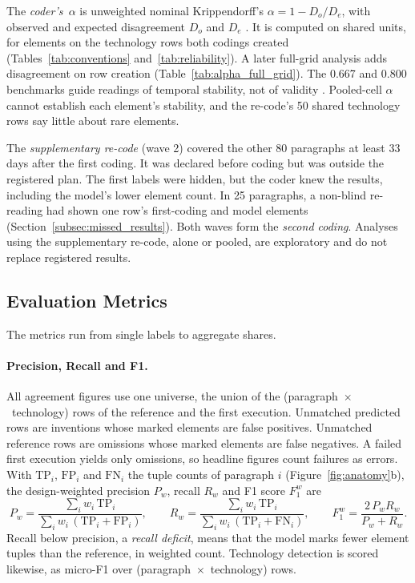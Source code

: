 The \emph{coder's~$\alpha$} is unweighted nominal Krippendorff's $\alpha = 1 - D_o/D_e$, with observed and expected disagreement $D_o$ and $D_e$ \parencite[pp.~1, 3]{krippendorff2011computing}. It is computed on shared units, for elements on the technology rows both codings created (Tables~\ref{tab:conventions} and~\ref{tab:reliability}). A later full-grid analysis adds disagreement on row creation (Table~\ref{tab:alpha_full_grid}). The 0.667 and 0.800 benchmarks guide readings of temporal stability, not of validity \parencite[p.~241]{krippendorff2004contentanalysis}. Pooled-cell $\alpha$ cannot establish each element's stability, and the re-code's 50 shared technology rows say little about rare elements.

The \emph{supplementary re-code} (wave 2) covered the other 80 paragraphs at least 33 days after the first coding. It was declared before coding but was outside the registered plan. The first labels were hidden, but the coder knew the results, including the model's lower element count. In 25 paragraphs, a non-blind re-reading had shown one row's first-coding and model elements (Section~\ref{subsec:missed_results}). Both waves form the \emph{second coding}. Analyses using the supplementary re-code, alone or pooled, are exploratory and do not replace registered results.

\subsection{Evaluation Metrics}\label{subsec:metrics}

The metrics run from single labels to aggregate shares.

\paragraph{Precision, Recall and F1.} All agreement figures use one universe, the union of the (paragraph~$\times$~technology) rows of the reference and the first execution. Unmatched predicted rows are inventions whose marked elements are false positives. Unmatched reference rows are omissions whose marked elements are false negatives. A failed first execution yields only omissions, so headline figures count failures as errors. With $\mathrm{TP}_i$, $\mathrm{FP}_i$ and $\mathrm{FN}_i$ the tuple counts of paragraph $i$ (Figure~\ref{fig:anatomy}b), the design-weighted precision $P_w$, recall $R_w$ and F1 score $F_1^{w}$ are
\begin{equation}
P_w = \frac{\sum_i w_i\,\mathrm{TP}_i}{\sum_i w_i\,(\mathrm{TP}_i + \mathrm{FP}_i)}, \qquad
R_w = \frac{\sum_i w_i\,\mathrm{TP}_i}{\sum_i w_i\,(\mathrm{TP}_i + \mathrm{FN}_i)}, \qquad
F_1^{w} = \frac{2\,P_w R_w}{P_w + R_w}.
\label{eq:microf1}
\end{equation}
Recall below precision, a \emph{recall deficit}, means that the model marks fewer element tuples than the reference, in weighted count. Technology detection is scored likewise, as micro-F1 over (paragraph~$\times$~technology) rows.


